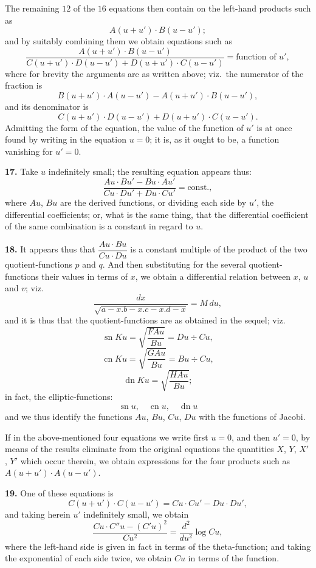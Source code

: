 \documentclass[12pt,a4paper]{article}
\DeclareMathOperator{\sn}{sn}
\DeclareMathOperator{\cn}{cn}
\DeclareMathOperator{\dn}{dn}
\theoremstyle{definition}
\begin{document}
The remaining $12$ of the $16$ equations then contain on the left-hand products such as
\[
A(u + u') \cdot B(u - u');
\]
and by suitably combining them we obtain equations such as
\[
\frac{A(u + u') \cdot B(u - u')}{C(u + u') \cdot D(u - u') + D(u + u') \cdot C(u - u')} = \text{function of } u',
\]
where for brevity the arguments are as written above; viz.\ the numerator of the fraction is
\[
B(u + u') \cdot A(u - u') - A(u + u') \cdot B(u - u'),
\]
and its denominator is
\[
C(u + u') \cdot D(u - u') + D(u + u') \cdot C(u - u').
\]
Admitting the form of the equation, the value of the function of $u'$ is at once found by writing in the equation $u = 0$; it is, as it ought to be, a function vanishing for $u' = 0$.

\noindent\textbf{17.}\quad
Take $u$ indefinitely small; the resulting equation appears thus:
\[
\frac{Au \cdot Bu' - Bu \cdot Au'}{Cu \cdot Du' + Du \cdot Cu'} = \text{const.},
\]
where $Au$, $Bu$ are the derived functions, or dividing each side by $u'$, the differential coefficients; or, what is the same thing, that the differential coefficient of the same combination is a constant in regard to $u$.

\noindent\textbf{18.}\quad
It appears thus that $\dfrac{Au \cdot Bu}{Cu \cdot Du}$ is a constant multiple of the product of the two quotient-functions $p$ and $q$. And then substituting for the several quotient-functions their values in terms of $x$, we obtain a differential relation between $x$, $u$ and $v$; viz.
\[
\frac{dx}{\sqrt{a - x . b - x . c - x . d - x}} = M\, du,
\]
and it is thus that the quotient-functions are as obtained in the sequel; viz.
\[
\sn Ku = \sqrt{\frac{FAu}{Bu}} = Du \div Cu,
\]
\[
\cn Ku = \sqrt{\frac{GAu}{Bu}} = Bu \div Cu,
\]
\[
\dn Ku = \sqrt{\frac{HAu}{Bu}};
\]
in fact, the elliptic-functions:
\[
\sn u,\quad \cn u,\quad \dn u
\]
and we thus identify the functions $Au$, $Bu$, $Cu$, $Du$ with the functions of Jacobi.

If in the above-mentioned four equations we write first $u = 0$, and then $u' = 0$, by means of the results eliminate from the original equations the quantities $X$, $Y$, $X'$, $Y'$ which occur therein, we obtain expressions for the four products such as $A(u + u') \cdot A(u - u')$.

\noindent\textbf{19.}\quad
One of these equations is
\[
C(u + u') \cdot C(u - u') = Cu \cdot Cu' - Du \cdot Du',
\]
and taking herein $u'$ indefinitely small, we obtain
\[
\frac{Cu \cdot C''u - (C'u)^2}{Cu^2} = \frac{d^2}{du^2}\log Cu,
\]
where the left-hand side is given in fact in terms of the theta-function; and taking the exponential of each side twice, we obtain $Cu$ in terms of the function.
\end{document}
